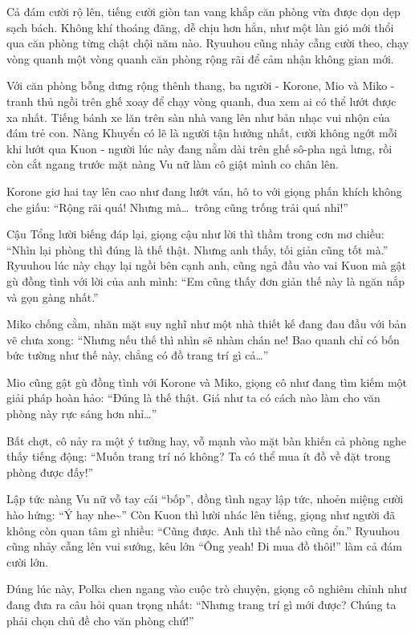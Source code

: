 \documentclass[../main.tex]{subfiles}
\begin{document}
Cả đám cười rộ lên, tiếng cười giòn tan vang khắp căn phòng vừa được dọn dẹp sạch bách. Không khí thoáng đãng, dễ chịu hơn hẳn, như một làn gió mới thổi qua căn phòng từng chật chội năm nào. Ryuuhou cũng nhảy cẫng cười theo, chạy vòng quanh một vòng quanh căn phòng rộng rãi để cảm nhận không gian mới.

Với căn phòng bỗng dưng rộng thênh thang, ba người - Korone, Mio và Miko - tranh thủ ngồi trên ghế xoay để chạy vòng quanh, đua xem ai có thể lướt được xa nhất. Tiếng bánh xe lăn trên sàn nhà vang lên như bản nhạc vui nhộn của đám trẻ con. Nàng Khuyển có lẽ là người tận hưởng nhất, cười không ngớt mỗi khi lướt qua Kuon - người lúc này đang nằm dài trên ghế sô-pha ngả lưng, rồi còn cắt ngang trước mặt nàng Vu nữ làm cô giật mình co chân lên.


Korone giơ hai tay lên cao như đang lướt ván, hô to với giọng phấn khích không che giấu: ``Rộng rãi quá! Nhưng mà\dots\ trông cũng trống trải quá nhỉ!''

Cậu Tổng lười biếng đáp lại, giọng cậu như lời thì thầm trong cơn mơ chiều: ``Nhìn lại phòng thì đúng là thế thật. Nhưng anh thấy, tối giản cũng tốt mà.'' Ryuuhou lúc này chạy lại ngồi bên cạnh anh, cũng ngả đầu vào vai Kuon mà gật gù đồng tình với lời của anh mình: ``Em cũng thấy đơn giản thế này là ngăn nắp và gọn gàng nhất.''

Miko chống cằm, nhăn mặt suy nghĩ như một nhà thiết kế đang đau đầu với bản vẽ chưa xong: ``Nhưng nếu thế thì nhìn sẽ nhàm chán ne! Bao quanh chỉ có bốn bức tường như thế này, chẳng có đồ trang trí gì cả\dots''

Mio cũng gật gù đồng tình với Korone và Miko, giọng cô như đang tìm kiếm một giải pháp hoàn hảo: ``Đúng là thế thật. Giá như ta có cách nào làm cho văn phòng này rực sáng hơn nhỉ\dots''

Bất chợt, cô nảy ra một ý tưởng hay, vỗ mạnh vào mặt bàn khiến cả phòng nghe thấy tiếng động: ``Muốn trang trí nó không? Ta có thể mua ít đồ về đặt trong phòng được đấy!''

Lập tức nàng Vu nữ vỗ tay cái ``bốp'', đồng tình ngay lập tức, nhoẻn miệng cười hào hứng: ``Ý hay nhe\~{}'' Còn Kuon thì lười nhác lên tiếng, giọng như người đã không còn quan tâm gì nhiều: ``Cũng được. Anh thì thế nào cũng ổn.'' Ryuuhou cũng nhảy cẫng lên vui sướng, kêu lớn ``Ông yeah! Đi mua đồ thôi!'' làm cả đám cười lớn.

Đúng lúc này, Polka chen ngang vào cuộc trò chuyện, giọng cô nghiêm chỉnh như đang đưa ra câu hỏi quan trọng nhất: ``Nhưng trang trí gì mới được? Chúng ta phải chọn chủ đề cho văn phòng chứ!''
\end{document}
